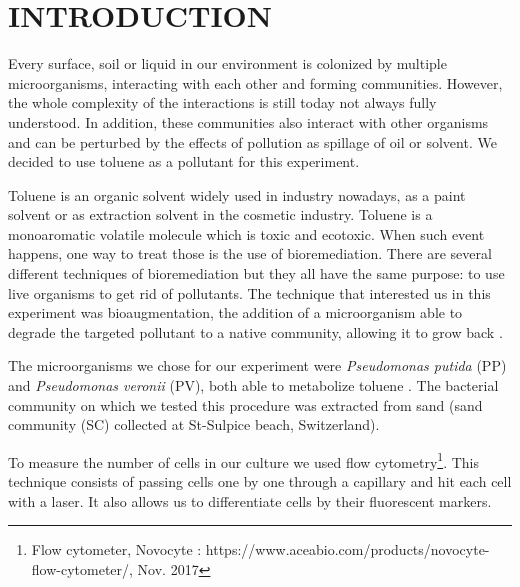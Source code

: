 \documentclass[a4paper, 10pt, conference]{ieeeconf}   %
\begin{document}
\section{INTRODUCTION}


Every surface, soil or liquid in our environment is colonized by multiple microorganisms, interacting with each other and forming communities. However, the whole complexity of the interactions is still today not always fully understood.
In addition, these communities also interact with other organisms and can be perturbed by the effects of pollution as spillage of oil or solvent. We decided to use toluene as a pollutant for this experiment.

Toluene is an organic solvent widely used in industry nowadays, as a paint solvent or as extraction solvent in the cosmetic industry. Toluene is a monoaromatic volatile molecule which is toxic and ecotoxic\cite{toluene}. 
When such event happens, one way to treat those is the use of bioremediation. There are several different techniques of bioremediation but they all have the same purpose: to use live organisms to get rid of pollutants. The technique that interested us in this experiment was bioaugmentation, the addition of a microorganism able to degrade the targeted pollutant to a native community, allowing it to grow back \cite{Bioremediation}.

The microorganisms we chose for our experiment were \textit{Pseudomonas putida} (PP) and \textit{Pseudomonas veronii} (PV), both able to metabolize toluene \cite{pseudomonas_putida} \cite{Pseudomonas_Veronii}. The bacterial community on which we tested this procedure was extracted from sand (sand community (SC) collected at St-Sulpice beach, Switzerland).

To measure the number of cells in our culture we used flow cytometry\footnote{Flow cytometer, Novocyte : https://www.aceabio.com/products/nov\linebreak[0]ocyte-flow-cytometer/, Nov. 2017}. This technique consists of passing cells one by one through a capillary and hit each cell with a laser. It also allows us to differentiate cells by their fluorescent markers.
\end{document}
